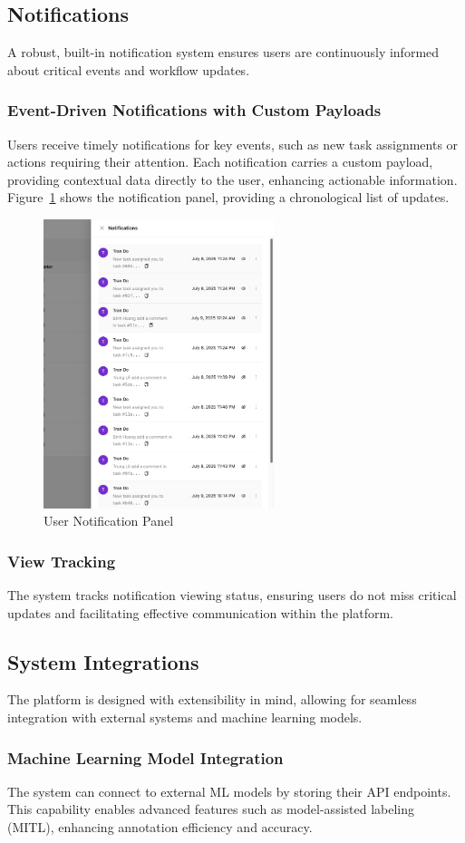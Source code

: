 \subsection{Notifications}
A robust, built-in notification system ensures users are continuously informed about critical events and workflow updates.

\subsubsection{Event-Driven Notifications with Custom Payloads}
Users receive timely notifications for key events, such as new task assignments or actions requiring their attention. Each notification carries a custom payload, providing contextual data directly to the user, enhancing actionable information. Figure~\ref{fig:notifications} shows the notification panel, providing a chronological list of updates.

\begin{figure}[h!]
    \centering
    \includegraphics[width=0.6\textwidth]{content//resources//features//notifications.png}
    \caption{User Notification Panel}
    \label{fig:notifications}
\end{figure}

\subsubsection{View Tracking}
The system tracks notification viewing status, ensuring users do not miss critical updates and facilitating effective communication within the platform.

\subsection{System Integrations}
The platform is designed with extensibility in mind, allowing for seamless integration with external systems and machine learning models.

\subsubsection{Machine Learning Model Integration}
The system can connect to external ML models by storing their API endpoints. This capability enables advanced features such as model-assisted labeling (MITL), enhancing annotation efficiency and accuracy.
